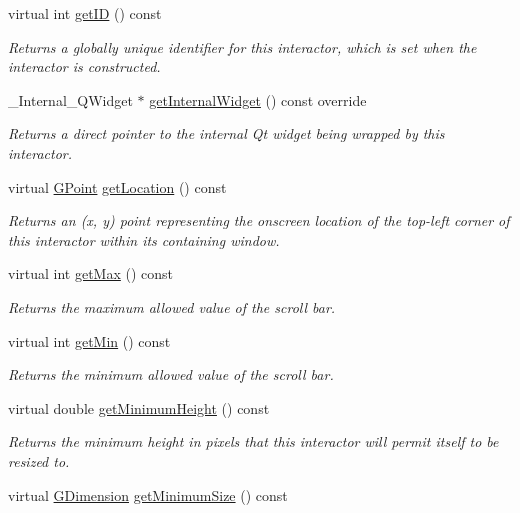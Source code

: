 \begin{DoxyCompactItemize}
virtual int \mbox{\hyperlink{classGInteractor_a9c9659a6c6ba66b4107ba59c95a24241}{get\+ID}} () const
\begin{DoxyCompactList}\small\item\em Returns a globally unique identifier for this interactor, which is set when the interactor is constructed. \end{DoxyCompactList}\item 
\+\_\+\+Internal\+\_\+\+Q\+Widget $\ast$ \mbox{\hyperlink{classGScrollBar_a2f6b36b2517087dc90a366b5ce1f5323}{get\+Internal\+Widget}} () const override
\begin{DoxyCompactList}\small\item\em Returns a direct pointer to the internal Qt widget being wrapped by this interactor. \end{DoxyCompactList}\item 
virtual \mbox{\hyperlink{structGPoint}{G\+Point}} \mbox{\hyperlink{classGInteractor_a4f83802015511edeb63b892830812c11}{get\+Location}} () const
\begin{DoxyCompactList}\small\item\em Returns an (x, y) point representing the onscreen location of the top-\/left corner of this interactor within its containing window. \end{DoxyCompactList}\item 
virtual int \mbox{\hyperlink{classGScrollBar_acc49776af85220307b8955d752d9ffcb}{get\+Max}} () const
\begin{DoxyCompactList}\small\item\em Returns the maximum allowed value of the scroll bar. \end{DoxyCompactList}\item 
virtual int \mbox{\hyperlink{classGScrollBar_ad06537e69f71666d30bec18dc042a6e4}{get\+Min}} () const
\begin{DoxyCompactList}\small\item\em Returns the minimum allowed value of the scroll bar. \end{DoxyCompactList}\item 
virtual double \mbox{\hyperlink{classGInteractor_aed4b0075fcc434499c3cb3e46896bda3}{get\+Minimum\+Height}} () const
\begin{DoxyCompactList}\small\item\em Returns the minimum height in pixels that this interactor will permit itself to be resized to. \end{DoxyCompactList}\item 
virtual \mbox{\hyperlink{structGDimension}{G\+Dimension}} \mbox{\hyperlink{classGInteractor_a66b5af0b32493b4d597ca0a3df2049ea}{get\+Minimum\+Size}} () const

\end{DoxyCompactItemize}
